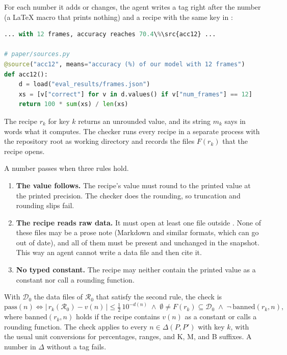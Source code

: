 For each number it adds or changes, the agent writes a tag \srcmacro{} right after the number (a \LaTeX{} macro that
prints nothing) and a recipe with the same key in :
\begin{lstlisting}[language=Python]
% paper/main.tex
... with 12 frames, accuracy reaches 70.4\%\src{acc12} ...

# paper/sources.py
@source("acc12", means="accuracy (%) of our model with 12 frames")
def acc12():
    d = load("eval_results/frames.json")
    xs = [v["correct"] for v in d.values() if v["num_frames"] == 12]
    return 100 * sum(xs) / len(xs)
\end{lstlisting}
The recipe $r_k$ for key $k$ returns an unrounded value, and its  string $m_k$ says in words what it
computes. The checker runs every recipe in a separate process with the repository root as working directory and
records the files $F(r_k)$ that the recipe opens.

A number passes when three rules hold.
\begin{enumerate}
  \item \textbf{The value follows.} The recipe's value must round to the printed value at the printed precision. The
        checker does the rounding, so truncation and rounding slips fail.
  \item \textbf{The recipe reads raw data.} It must open at least one file outside . None of these
        files may be a prose note (Markdown and similar formats, which can go out of date), and all of them must be
        present and unchanged in the snapshot. This way an agent cannot write a data file and then cite it.
  \item \textbf{No typed constant.} The recipe may neither contain the printed value as a constant nor call a
        rounding function.
\end{enumerate}
With $\mathcal{D}_0$ the data files of $\mathcal{R}_0$ that satisfy the second rule, the check is
\begin{equation}
  \mathrm{pass}(n) \iff \bigl|\, r_k(\mathcal{R}_0) - v(n) \,\bigr| \le \tfrac{1}{2}\, 10^{-d(n)}
  \;\wedge\; \emptyset \neq F(r_k) \subseteq \mathcal{D}_0
  \;\wedge\; \neg\, \mathrm{banned}(r_k, n),
  \label{eq:pass}
\end{equation}
where $\mathrm{banned}(r_k, n)$ holds if the recipe contains $v(n)$ as a constant or calls a rounding function. The
check applies to every $n \in \Delta(P, P')$ with key $k$, with the usual unit conversions for percentages, ranges, and
K, M, and B suffixes. A number in $\Delta$ without a tag fails.

